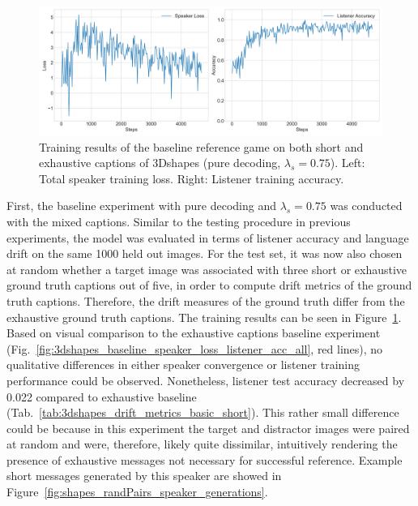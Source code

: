 \begin{figure}[h]
	\centering
	\includegraphics[width=\linewidth]{images/3dshapes_wShort_baseline_random_075_losses.png}
	\caption{Training results of the baseline reference game on both short and exhaustive captions of 3Dshapes (pure decoding, $\lambda_s=0.75$). Left: Total speaker training loss. Right: Listener training accuracy.}
	\label{fig:3dshapes_wShort_075_speaker_losses_listener_acc}
\end{figure}

First, the baseline experiment with pure decoding and $\lambda_s = 0.75$ was conducted with the mixed captions. Similar to the testing procedure in previous experiments, the model was evaluated in terms of listener accuracy and language drift on the same 1000 held out images. For the test set, it was now also chosen at random whether a target image was associated with three short or exhaustive ground truth captions out of five, in order to compute drift metrics of the ground truth captions. Therefore, the drift measures of the ground truth differ from the exhaustive ground truth captions.
The training results can be seen in Figure~\ref{fig:3dshapes_wShort_075_speaker_losses_listener_acc}. Based on visual comparison to the exhaustive captions baseline experiment (Fig.~\ref{fig:3dshapes_baseline_speaker_loss_listener_acc_all}, red lines), no qualitative differences in either speaker convergence or listener training performance could be observed. Nonetheless, listener test accuracy decreased by 0.022 compared to exhaustive baseline (Tab.~\ref{tab:3dshapes_drift_metrics_basic_short}).
This rather small difference could be because in this experiment the target and distractor images were paired at random and were, therefore, likely quite dissimilar, intuitively rendering the presence of exhaustive messages not necessary for successful reference. Example short messages generated by this speaker are showed in Figure~\ref{fig:shapes_randPairs_speaker_generations}.

